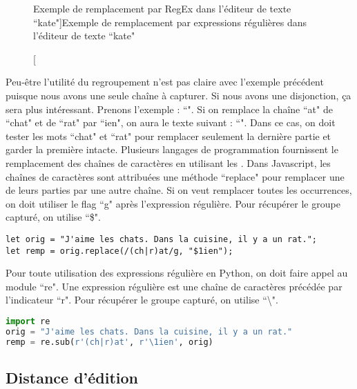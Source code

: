 \documentclass{KodeBook}
\begin{document}
\begin{figure}[ht]
	\centering
	\caption[Exemple de remplacement par RegEx dans l'éditeur de texte ``kate"]{Exemple de remplacement par expressions régulières dans l'éditeur de texte ``kate" \label{fig:kate_regex}}
\end{figure}


Peu-être l'utilité du regroupement n'est pas claire avec l'exemple précédent puisque nous avons une seule chaîne à capturer.
Si nous avons une disjonction, ça sera plus intéressant.
Prenons l'exemple : ``". 
Si on remplace la chaîne ``at" de ``chat" et de ``rat" par ``ien", on aura le texte suivant : 
``".
Dans ce cas, on doit tester les mots ``chat" et ``rat" pour remplacer seulement la dernière partie et garder la première intacte.
Plusieurs langages de programmation fournissent le remplacement des chaînes de caractères en utilisant les .
Dans Javascript, les chaînes de caractères sont attribuées une méthode ``replace" pour remplacer une de leurs parties par une autre chaîne. 
Si on veut remplacer toutes les occurrences, on doit utiliser le flag ``g" après l'expression régulière.
Pour récupérer le groupe capturé, on utilise ``\$".

\begin{lstlisting}[language={[KB]Javascript}, style=codeStyle]
let orig = "J'aime les chats. Dans la cuisine, il y a un rat.";
let remp = orig.replace(/(ch|r)at/g, "$1ien");
\end{lstlisting}

Pour toute utilisation des expressions régulière en Python, on doit faire appel au module ``re".
Une expression régulière est une chaîne de caractères précédée par l'indicateur ``r".
Pour récupérer le groupe capturé, on utilise ``\textbackslash".

\begin{lstlisting}[language=Python, style=codeStyle]
import re
orig = "J'aime les chats. Dans la cuisine, il y a un rat."
remp = re.sub(r'(ch|r)at', r'\1ien', orig)
\end{lstlisting}


\subsection{Distance d'édition}
\end{document}
